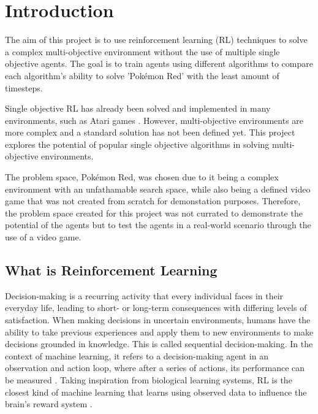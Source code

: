 \section{Introduction}

The aim of this project is to use reinforcement learning (RL) techniques to solve a complex multi-objective environment without the use of multiple single objective agents. The goal is to train agents using different algorithms to compare each algorithm's ability to solve 'Pokémon Red' with the least amount of timesteps. 

Single objective RL has already been solved and implemented in many environments, such as Atari games \cite{brockman2016openai}. However, multi-objective environments are more complex and a standard solution has not been defined yet. This project explores the potential of popular single objective algorithms in solving multi-objective environments.

The problem space, Pokémon Red, was chosen due to it being a complex environment with an unfathamable search space, while also being a defined video game that was not created from scratch for demonstation purposes. Therefore, the problem space created for this project was not currated to demonstrate the potential of the agents but to test the agents in a real-world scenario through the use of a video game.

\subsection{What is Reinforcement Learning}

Decision-making is a recurring activity that every individual faces in their everyday life, leading to short- or long-term consequences with differing levels of satisfaction. When making decisions in uncertain environments, humans have the ability to take previous experiences and apply them to new environments to make decisions grounded in knowledge. This is called sequential decision-making. In the context of machine learning, it refers to a decision-making agent in an observation and action loop, where after a series of actions, its performance can be measured \cite{francon2020effective}. Taking inspiration from biological learning systems, RL is the closest kind of machine learning that learns using observed data to influence the brain's reward system \cite{Sutton1}. 

